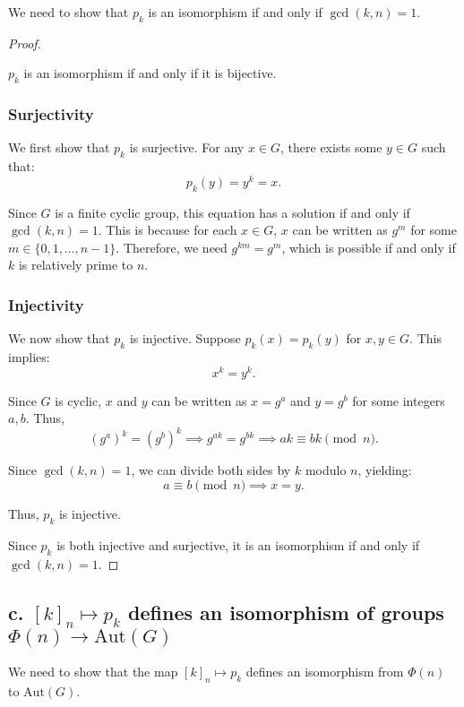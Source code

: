\documentclass[12pt]{amsart}
\theoremstyle{definition}
\numberwithin{equation}{section}
\begin{document}
\begin{exercise}{5}
    We need to show that \(p_k\) is an isomorphism if and only if \(\gcd(k, n) = 1\).
    
    \begin{proof} \( \)
    
    \(p_k\) is an isomorphism if and only if it is bijective.
    
    \subsubsection*{Surjectivity}
    We first show that \(p_k\) is surjective. For any \(x \in G\), there exists some \(y \in G\) such that:
    \[
    p_k(y) = y^k = x.
    \]
    
    Since \(G\) is a finite cyclic group, this equation has a solution if and only if \(\gcd(k, n) = 1\). This is because for each \(x \in G\), \(x\) can be written as \(g^m\) for some \(m \in \{0, 1, \ldots, n-1\}\). Therefore, we need \(g^{km} = g^m\), which is possible if and only if \(k\) is relatively prime to \(n\).
    
    \subsubsection*{Injectivity}
    We now show that \(p_k\) is injective. Suppose \(p_k(x) = p_k(y)\) for \(x, y \in G\). This implies:
    \[
    x^k = y^k.
    \]
    
    Since \(G\) is cyclic, \(x\) and \(y\) can be written as \(x = g^a\) and \(y = g^b\) for some integers \(a, b\). Thus,
    \[
    (g^a)^k = (g^b)^k \implies g^{ak} = g^{bk} \implies ak \equiv bk \pmod{n}.
    \]
    
    Since \(\gcd(k, n) = 1\), we can divide both sides by \(k\) modulo \(n\), yielding:
    \[
    a \equiv b \pmod{n} \implies x = y.
    \]
    
    Thus, \(p_k\) is injective.
    
    Since \(p_k\) is both injective and surjective, it is an isomorphism if and only if \(\gcd(k, n) = 1\).
    
    \end{proof}
    
    \subsection*{\textbf{c. \([k]_n \mapsto p_k\) defines an isomorphism of groups \(\Phi(n) \rightarrow \text{Aut}(G)\)}}
    
    We need to show that the map \([k]_n \mapsto p_k\) defines an isomorphism from \(\Phi(n)\) to \(\text{Aut}(G)\).
    

\end{exercise}
\end{document}
